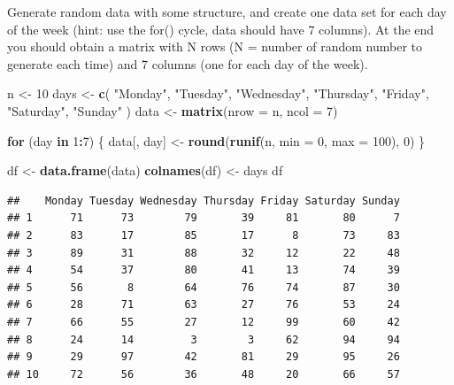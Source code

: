 \documentclass[
]{article}
\newenvironment{Shaded}{\begin{snugshade}}{\end{snugshade}}
\newcommand{\AttributeTok}[1]{\textcolor[rgb]{0.13,0.29,0.53}{#1}}
\newcommand{\ControlFlowTok}[1]{\textcolor[rgb]{0.13,0.29,0.53}{\textbf{#1}}}
\newcommand{\DecValTok}[1]{\textcolor[rgb]{0.00,0.00,0.81}{#1}}
\newcommand{\FunctionTok}[1]{\textcolor[rgb]{0.13,0.29,0.53}{\textbf{#1}}}
\newcommand{\NormalTok}[1]{#1}
\newcommand{\OtherTok}[1]{\textcolor[rgb]{0.56,0.35,0.01}{#1}}
\newcommand{\SpecialCharTok}[1]{\textcolor[rgb]{0.81,0.36,0.00}{\textbf{#1}}}
\newcommand{\StringTok}[1]{\textcolor[rgb]{0.31,0.60,0.02}{#1}}
\begin{document}
Generate random data with some structure, and create one data set for
each day of the week (hint: use the for() cycle, data should have 7
columns). At the end you should obtain a matrix with N rows (N = number
of random number to generate each time) and 7 columns (one for each day
of the week).

\begin{Shaded}
\begin{Highlighting}[]
\NormalTok{n }\OtherTok{\textless{}{-}} \DecValTok{10}
\NormalTok{days }\OtherTok{\textless{}{-}} \FunctionTok{c}\NormalTok{(}
  \StringTok{"Monday"}\NormalTok{,}
  \StringTok{"Tuesday"}\NormalTok{,}
  \StringTok{"Wednesday"}\NormalTok{,}
  \StringTok{"Thursday"}\NormalTok{,}
  \StringTok{"Friday"}\NormalTok{,}
  \StringTok{"Saturday"}\NormalTok{,}
  \StringTok{"Sunday"}
\NormalTok{)}
\NormalTok{data }\OtherTok{\textless{}{-}} \FunctionTok{matrix}\NormalTok{(}\AttributeTok{nrow =}\NormalTok{ n, }\AttributeTok{ncol =} \DecValTok{7}\NormalTok{)}

\ControlFlowTok{for}\NormalTok{ (day }\ControlFlowTok{in} \DecValTok{1}\SpecialCharTok{:}\DecValTok{7}\NormalTok{) \{}
\NormalTok{  data[, day] }\OtherTok{\textless{}{-}} \FunctionTok{round}\NormalTok{(}\FunctionTok{runif}\NormalTok{(n, }\AttributeTok{min =} \DecValTok{0}\NormalTok{, }\AttributeTok{max =} \DecValTok{100}\NormalTok{), }\DecValTok{0}\NormalTok{)}
\NormalTok{\}}

\NormalTok{df }\OtherTok{\textless{}{-}} \FunctionTok{data.frame}\NormalTok{(data)}
\FunctionTok{colnames}\NormalTok{(df) }\OtherTok{\textless{}{-}}\NormalTok{ days}
\NormalTok{df}
\end{Highlighting}
\end{Shaded}

\begin{verbatim}
##    Monday Tuesday Wednesday Thursday Friday Saturday Sunday
## 1      71      73        79       39     81       80      7
## 2      83      17        85       17      8       73     83
## 3      89      31        88       32     12       22     48
## 4      54      37        80       41     13       74     39
## 5      56       8        64       76     74       87     30
## 6      28      71        63       27     76       53     24
## 7      66      55        27       12     99       60     42
## 8      24      14         3        3     62       94     94
## 9      29      97        42       81     29       95     26
## 10     72      56        36       48     20       66     57
\end{verbatim}
\end{document}
